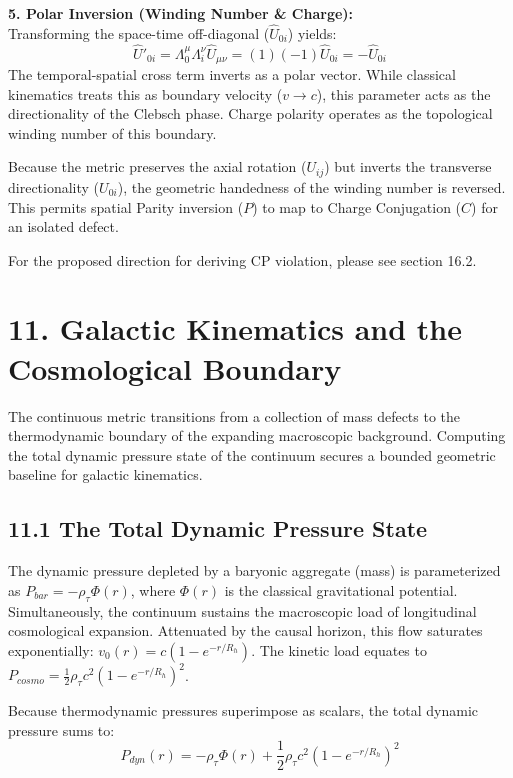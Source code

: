 \textbf{5. Polar Inversion (Winding Number \& Charge):} \\ 
Transforming the space-time off-diagonal ($\hat{U}_{0i}$) yields:
\begin{equation}
    \hat{U}'_{0i} = \Lambda^\mu_0 \Lambda^\nu_i \hat{U}_{\mu\nu} = (1)(-1)\hat{U}_{0i} = -\hat{U}_{0i} 
\end{equation}
The temporal-spatial cross term inverts as a polar vector. While classical kinematics treats this as boundary velocity ($v \to c$), this parameter acts as the directionality of the Clebsch phase. Charge polarity operates as the topological winding number of this boundary. 

Because the metric preserves the axial rotation ($U_{ij}$) but inverts the transverse directionality ($U_{0i}$), the geometric handedness of the winding number is reversed. This permits spatial Parity inversion ($P$) to map to Charge Conjugation ($C$) for an isolated defect. 

For the proposed direction for deriving CP violation, please see section 16.2.

\section*{11. Galactic Kinematics and the Cosmological Boundary} \label{sec:macroscopic_basin}
The continuous metric transitions from a collection of mass defects to the thermodynamic boundary of the expanding macroscopic background. Computing the total dynamic pressure state of the continuum secures a bounded geometric baseline for galactic kinematics.

\subsection*{11.1 The Total Dynamic Pressure State} 
The dynamic pressure depleted by a baryonic aggregate (mass) is parameterized as $P_{bar} = -\rho_\tau \Phi(r)$, where $\Phi(r)$ is the classical gravitational potential. Simultaneously, the continuum sustains the macroscopic load of longitudinal cosmological expansion. Attenuated by the causal horizon, this flow saturates exponentially: $v_0(r) = c(1 - e^{-r/R_h})$. The kinetic load equates to $P_{cosmo} = \frac{1}{2}\rho_\tau c^2 (1 - e^{-r/R_h})^2$.

Because thermodynamic pressures superimpose as scalars, the total dynamic pressure sums to: 
\begin{equation} 
P_{dyn}(r) = -\rho_\tau \Phi(r) + \frac{1}{2}\rho_\tau c^2 \left( 1 - e^{-r/R_h} \right)^2 \label{eq:total_pdyn_sds} 
\end{equation}

